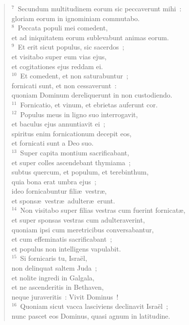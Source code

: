 \begin{flushleft}
\begin{verse}
${}^{7}$~Secundum multitudinem eorum sic peccaverunt mihi~:\\ gloriam eorum in ignominiam commutabo.\\
${}^{8}$~Peccata populi mei comedent,\\ et ad iniquitatem eorum sublevabunt animas eorum.\\
${}^{9}$~Et erit sicut populus, sic sacerdos~;\\ et visitabo super eum vias ejus,\\ et cogitationes ejus reddam ei.\\
${}^{10}$~Et comedent, et non saturabuntur~;\\ fornicati sunt, et non cessaverunt~:\\ quoniam Dominum dereliquerunt in non custodiendo.\\
${}^{11}$~Fornicatio, et vinum, et ebrietas auferunt cor.\\
${}^{12}$~Populus meus in ligno suo interrogavit,\\ et baculus ejus annuntiavit ei~;\\ spiritus enim fornicationum decepit eos,\\ et fornicati sunt a Deo suo.\\
${}^{13}$~Super capita montium sacrificabant,\\ et super colles ascendebant thymiama~;\\ subtus quercum, et populum, et terebinthum,\\ quia bona erat umbra ejus~;\\ ideo fornicabuntur fili\ae\ vestr\ae ,\\ et spons\ae\ vestr\ae\ adulter\ae\ erunt.\\
${}^{14}$~Non visitabo super filias vestras cum fuerint fornicat\ae ,\\ et super sponsas vestras cum adulteraverint,\\ quoniam ipsi cum meretricibus conversabantur,\\ et cum effeminatis sacrificabant~;\\ et populus non intelligens vapulabit.\\
${}^{15}$~Si fornicaris tu, Isra\"el,\\ non delinquat saltem Juda~;\\ et nolite ingredi in Galgala,\\ et ne ascenderitis in Bethaven,\\ neque juraveritis~: Vivit Dominus~!\\
${}^{16}$~Quoniam sicut vacca lasciviens declinavit Isra\"el~;\\ nunc pascet eos Dominus, quasi agnum in latitudine.\\

\end{verse}
\end{flushleft}
